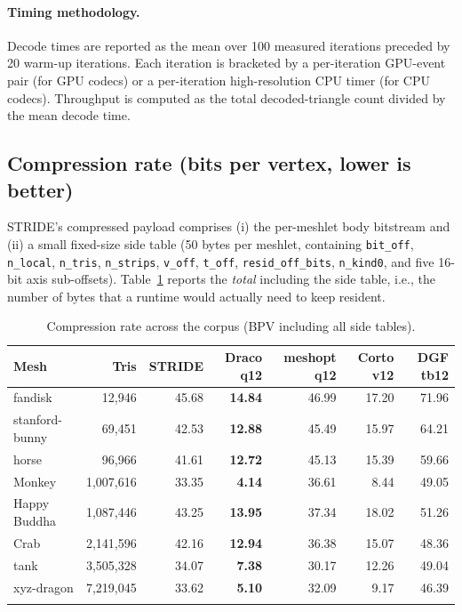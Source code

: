 \documentclass[pdflatex,sn-vancouver-num]{sn-jnl}%
\theoremstyle{thmstyleone}%
\theoremstyle{thmstyletwo}%
\theoremstyle{thmstylethree}%
\begin{document}
\paragraph{Timing methodology.}
Decode times are reported as the mean over 100 measured iterations preceded by 20 warm-up iterations. Each iteration is bracketed by a per-iteration GPU-event pair (for GPU codecs) or a per-iteration high-resolution CPU timer (for CPU codecs). Throughput is computed as the total decoded-triangle count divided by the mean decode time.

\subsection{Compression rate (bits per vertex, lower is better)}\label{sec:rate}

STRIDE's compressed payload comprises (i) the per-meshlet body bitstream and (ii) a small fixed-size side table (50 bytes per meshlet, containing \texttt{bit\_off}, \texttt{n\_local}, \texttt{n\_tris}, \texttt{n\_strips}, \texttt{v\_off}, \texttt{t\_off}, \texttt{resid\_off\_bits}, \texttt{n\_kind0}, and five 16-bit axis sub-offsets). Table~\ref{tab:bpv} reports the \emph{total} including the side table, i.e., the number of bytes that a runtime would actually need to keep resident.

\begin{table}[ht]
\caption{Compression rate across the corpus (BPV including all side tables).}\label{tab:bpv}
\begin{tabular*}{\textwidth}{@{\extracolsep\fill}lrrrrrr@{}}
\toprule
Mesh & Tris & \textbf{STRIDE} & Draco q12 & meshopt q12 & Corto v12 & DGF tb12 \\
\midrule
fandisk        & 12{,}946    & 45.68 & \textbf{14.84} & 46.99 & 17.20 & 71.96 \\
stanford-bunny & 69{,}451    & 42.53 & \textbf{12.88} & 45.49 & 15.97 & 64.21 \\
horse          & 96{,}966    & 41.61 & \textbf{12.72} & 45.13 & 15.39 & 59.66 \\
Monkey         & 1{,}007{,}616 & 33.35 & \textbf{4.14} & 36.61 & 8.44  & 49.05 \\
Happy Buddha   & 1{,}087{,}446 & 43.25 & \textbf{13.95} & 37.34 & 18.02 & 51.26 \\
Crab           & 2{,}141{,}596 & 42.16 & \textbf{12.94} & 36.38 & 15.07 & 48.36 \\
tank           & 3{,}505{,}328 & 34.07 & \textbf{7.38} & 30.17 & 12.26 & 49.04 \\
xyz-dragon     & 7{,}219{,}045 & 33.62 & \textbf{5.10} & 32.09 & 9.17  & 46.39 \\
\botrule
\end{tabular*}
\end{table}
\end{document}
